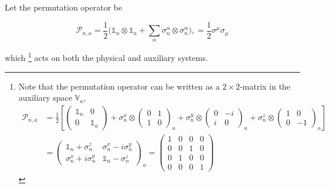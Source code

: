 \documentclass{homework}
\begin{document}
\begin{df}
    Let the permutation operator be
    
    \begin{equation}
        \bm{\mathcal P}_{n,a} = \frac{1}{2} \bigg(\mathds{1}_n \otimes \mathds{1}_a + \sum_{\alpha}\sigma_n^{\alpha}  \otimes \sigma_n^{\alpha} \bigg), = \frac{1}{2} \sigma^{\mu}\sigma_{\mu}
        \label{permutation op}
    \end{equation}
    
    which \footnote{Note that the permutation operator can be written as a $2 \times 2$-matrix in the auxiliary space $\mathds{V}_a$,
\begin{equation} 
\begin{split}
    \bm{\mathcal P}_{n,a} &= \frac{1}{2} \left[ \left(\begin{array}{cc}
        \mathds{1}_n & 0  \\
        0 & \mathds{1}_a 
    \end{array}\right) + \sigma^{x}_{n} \otimes \left(\begin{array}{cc}
        0 & 1 \\
        1 & 0
    \end{array}\right)_a + \sigma^{y}_{n} \otimes \left(\begin{array}{cc}
        0 & -i \\
        i & 0 
    \end{array}\right)_a + \sigma^{z}_{n} \otimes \left(\begin{array}{cc}
        1 & 0  \\
        0 & -1
    \end{array}\right)_a \right] \\
    &= \left(\begin{array}{cc}
       \mathds{1}_n + \sigma^{z}_{n} &  \sigma^{x}_{n} - i\sigma^{y}_{n} \\
       \sigma^{x}_{n} + i\sigma^{y}_{n}  & \mathds{1}_n - \sigma^{z}_{n}
    \end{array}\right)_a = \left(\begin{array}{cccc}
        1 & 0 & 0 & 0   \\
        0 & 0 & 1 & 0   \\
        0 & 1 & 0 & 0   \\
        0 & 0 & 0 & 1
    \end{array}\right)
    \end{split}
\end{equation}} acts on both the physical and auxiliary systems.
\end{df}
\end{document}
